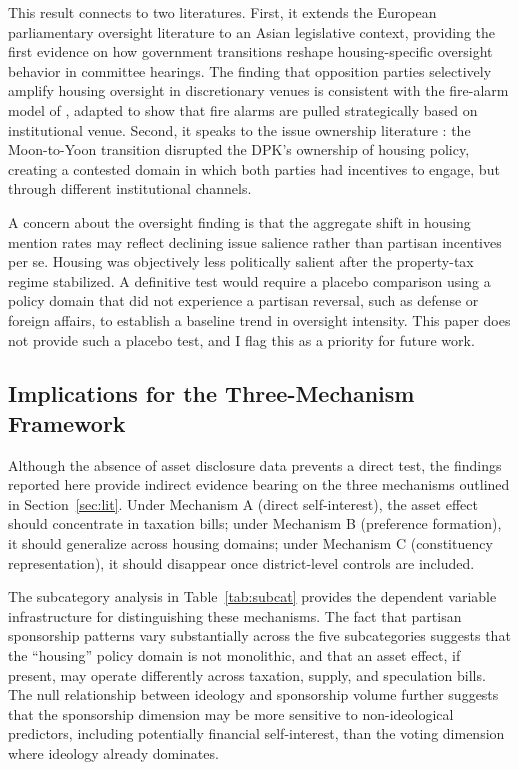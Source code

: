 \documentclass[11pt]{article}
\begin{document}
This result connects to two literatures. First, it extends the European parliamentary oversight literature \citep{jensen2013, senninger2016, karlsson2022} to an Asian legislative context, providing the first evidence on how government transitions reshape housing-specific oversight behavior in committee hearings. The finding that opposition parties selectively amplify housing oversight in discretionary venues is consistent with the fire-alarm model of \citet{mccubbinsSchwartz1984}, adapted to show that fire alarms are pulled strategically based on institutional venue. Second, it speaks to the issue ownership literature \citep{petrocik1996}: the Moon-to-Yoon transition disrupted the DPK's ownership of housing policy, creating a contested domain in which both parties had incentives to engage, but through different institutional channels.

A concern about the oversight finding is that the aggregate shift in housing mention rates may reflect declining issue salience rather than partisan incentives per se. Housing was objectively less politically salient after the property-tax regime stabilized. A definitive test would require a placebo comparison using a policy domain that did not experience a partisan reversal, such as defense or foreign affairs, to establish a baseline trend in oversight intensity. This paper does not provide such a placebo test, and I flag this as a priority for future work.

\subsection{Implications for the Three-Mechanism Framework}

Although the absence of asset disclosure data prevents a direct test, the findings reported here provide indirect evidence bearing on the three mechanisms outlined in Section~\ref{sec:lit}. Under Mechanism A (direct self-interest), the asset effect should concentrate in taxation bills; under Mechanism B (preference formation), it should generalize across housing domains; under Mechanism C (constituency representation), it should disappear once district-level controls are included.

The subcategory analysis in Table~\ref{tab:subcat} provides the dependent variable infrastructure for distinguishing these mechanisms. The fact that partisan sponsorship patterns vary substantially across the five subcategories suggests that the ``housing'' policy domain is not monolithic, and that an asset effect, if present, may operate differently across taxation, supply, and speculation bills. The null relationship between ideology and sponsorship volume further suggests that the sponsorship dimension may be more sensitive to non-ideological predictors, including potentially financial self-interest, than the voting dimension where ideology already dominates.
\end{document}
